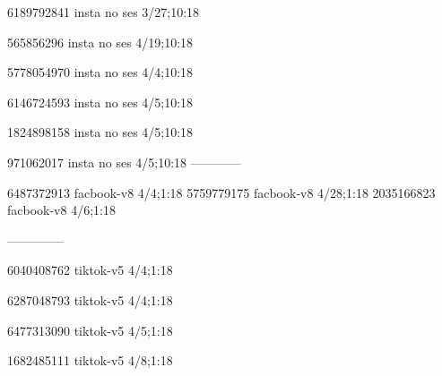 6189792841 insta no ses
3/27;10:18

565856296 insta no ses
4/19;10:18

5778054970 insta no ses
4/4;10:18

6146724593 insta no ses
4/5;10:18

1824898158 insta no ses
4/5;10:18

971062017 insta no ses
4/5;10:18
------------

6487372913 facbook-v8
4/4;1:18
5759779175 facbook-v8
4/28;1:18
2035166823 facbook-v8
4/6;1:18

--------------

6040408762 tiktok-v5
4/4;1:18

6287048793 tiktok-v5
4/4;1:18

6477313090 tiktok-v5
4/5;1:18

1682485111 tiktok-v5
4/8;1:18
